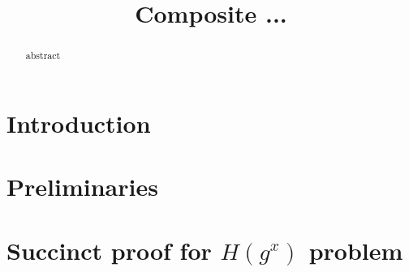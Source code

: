 \documentclass{llncs}
\title{Composite ...}
\begin{document}
\maketitle
\begin{abstract} 
 abstract
  \end{abstract} 



\section{Introduction}

%

\section{Preliminaries}\label{sec:prelims}



\section{Succinct proof for $H(g^x)$ problem}\label{sec:knowledgexKEA}





%

%
%

%


%

%

%
%
%





%
\end{document}
